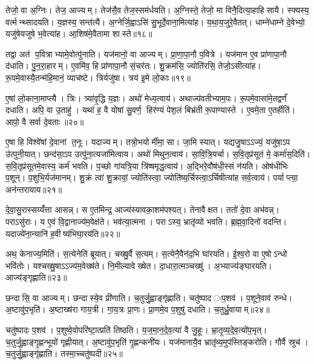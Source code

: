 तेजो॒ वा अ॒ग्निः। तेज॒ आज्यम्। तेज॑सै॒व तेज॒स्सम॑र्धयति। अ॒ग्निस्ते॒ तेजो॒ मा विनै॒दित्या॒हाहिसायै। स्फ्यस्य॒ वर्त्मन्थ्सादयति। य॒ज्ञस्य॒ सन्त॑त्यै। अ॒ग्नेर्जि॒ह्वाऽसि॑ सु॒भूर्दे॒वाना॒मित्या॑ह। य॒था॒य॒जुरे॒वैतत्। धाम्ने॑धाम्ने दे॒वेभ्यो॒ यजु॑षेयजुषे भ॒वेत्या॑ह। आ॒शिष॑मे॒वैतामा शास्ते॥१८॥

तद्वा अत॑ प॒वित्राभ्यामे॒वोत्पु॑नाति। यज॑मानो॒ वा आज्यम्। प्रा॒णा॒पा॒नौ प॒वित्रे। यज॑मान ए॒व प्रा॑णापा॒नौ द॑धाति। पु॒न॒रा॒हारम्। ए॒वमि॑व॒ हि प्रा॑णापा॒नौ सं॒चर॑तः। शु॒क्रम॑सि॒ ज्योति॑रसि॒ तेजो॒ऽसीत्या॑ह। रू॒पमे॒वास्यै॒तन्म॑हि॒मानं॒ व्याच॑ष्टे। त्रिर्यजु॑षा। त्रय॑ इ॒मे लो॒काः॥१९॥

ए॒षां लो॒काना॒माप्त्यै। त्रिः। त्र्या॑वृ॒द्धि य॒ज्ञः। अथो॑ मेध्य॒त्वाय॑। अथाज्य॑वतीभ्याम॒पः। रू॒पमे॒वासा॑मे॒तद्वर्णं॑ दधाति। अपि॒ वा उ॒ताहु॑। यथा॑ ह॒ वै योषा॑ सु॒वर्ण॒ हिर॑ण्यं पेश॒लं बिभ्र॑ती रू॒पाण्यास्ते। ए॒वमे॒ता ए॒तर्\mbox{}हीति॑। आपो॒ वै सर्वा दे॒वताः॥२०॥

ए॒षा हि विश्वे॑षां दे॒वानां त॒नूः। यदाज्यम्। तत्रो॒भयोर्मीमा॒सा। जा॒मि स्यात्। यद्यजु॒षाऽऽज्यं॒ यजु॑षा॒ऽप उ॑त्पुनी॒यात्। छन्द॑सा॒ऽप उत्पु॑ना॒त्यजा॑मित्वाय। अथो॑ मिथुन॒त्वाय॑। सा॒वि॒त्रि॒यर्चा। स॒वि॒तृप्र॑सूतं मे॒ कर्मा॑स॒दिति॑। स॒वि॒तृप्र॑सूतमे॒वास्य॒ कर्म॑ भवति। प॒च्छो गा॑यत्रि॒या त्रि॑ष्षमृद्ध॒त्वाय॑। अ॒द्भिरे॒वौष॑धी॒स्सं न॑यति। ओष॑धीभिः प॒शून्। प॒शुभि॒र्यज॑मानम्। शु॒क्रं त्वा॑ शु॒क्रायां॒ ज्योति॑स्त्वा॒ ज्योति॑ष्य॒र्चिस्त्वा॒ऽर्चिषीत्या॑ह सर्व॒त्वाय॑। पर्याप्त्या॒ अन॑न्तरायाय॥२१॥\anuvakamend[ई॒क्ष॒त॒ आ॒ह॒ शा॒स्ते॒ लो॒का दे॒वता॑ भवति॒ षट् च॑]

दे॒वा॒सु॒रास्सय्यँ॑त्ता आसन्न्। स ए॒तमिन्द्र॒ आज्य॑स्यावका॒शम॑पश्यत्। तेनावैक्षत। ततो॑ दे॒वा अभ॑वन्न्। पराऽसु॑राः। य ए॒वं वि॒द्वानाज्य॑म॒वेक्ष॑ते। भव॑त्या॒त्मना। पराऽस्य॒ भ्रातृ॑व्यो भवति। ब्र॒ह्म॒वा॒दिनो॑ वदन्ति। यदाज्ये॑ना॒न्यानि॑ ह॒वीष्य॑भिघा॒रय॑ति॥२२॥

अथ॒ केनाज्य॒मिति॑। स॒त्येनेति॑ ब्रूयात्। चख्षु॒र्वै स॒त्यम्। स॒त्येनै॒वैन॑द॒भि घा॑रयति। ई॒श्व॒रो वा ए॒षोऽन्धो भवि॑तोः। यश्चख्षु॒षाऽऽज्य॑म॒वेख्ष॑ते। नि॒मील्यावेख्षेत। दा॒धारा॒त्मञ्चख्षु॑। अ॒भ्याज्य॑ङ्घारयति। आज्य॑ङ्गृह्णाति॥२३॥

छन्दासि॒ वा आज्यम्। छन्दास्ये॒व प्री॑णाति। च॒तुर्जु॒ह्वाङ्गृ॑ह्णाति। चतु॑ष्पाद ःप॒शव॑। प॒शूने॒वाव॑ रुन्धे। अ॒ष्टावु॑प॒भृति॑। अ॒ष्टाख्ष॑रा गाय॒त्री। गा॒य॒त्रः प्रा॒णः। प्रा॒णमे॒व प॒शुषु॑ दधाति। च॒तुर्ध्रु॒वायाम्॥२४॥

चतु॑ष्पादः प॒शव॑। प॒शुष्वे॒वोपरि॑ष्टा॒त्प्रति॑ तिष्ठति। य॒ज॒मा॒न॒दे॒व॒त्या॑ वै जु॒हूः। भ्रा॒तृ॒व्य॒दे॒व॒त्यो॑प॒भृत्। च॒तुर्जु॒ह्वाङ्गृ॒ह्णन्भूयो॑ गृह्णीयात्। अ॒ष्टावु॑प॒भृति॑ गृ॒ह्णन्कनी॑यः। यज॑मानायै॒व भ्रातृ॑व्य॒मुप॑स्तिङ्करोति। गौर्वै स्रुच॑। च॒तुर्जु॒ह्वाङ्गृ॑ह्णाति। तस्मा॒च्चतु॑ष्पदी॥२५॥

